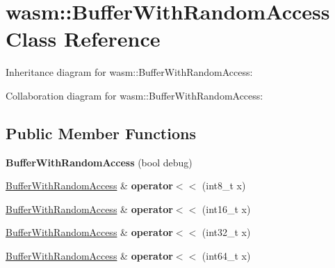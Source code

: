 \hypertarget{classwasm_1_1_buffer_with_random_access}{}\section{wasm\+:\+:Buffer\+With\+Random\+Access Class Reference}
\label{classwasm_1_1_buffer_with_random_access}


Inheritance diagram for wasm\+:\+:Buffer\+With\+Random\+Access\+:


Collaboration diagram for wasm\+:\+:Buffer\+With\+Random\+Access\+:
\subsection*{Public Member Functions}
\begin{DoxyCompactItemize}
\item 
\mbox{\label{classwasm_1_1_buffer_with_random_access_a9eb22137105e617a61d2772efd52cf34}} 
{\bfseries Buffer\+With\+Random\+Access} (bool debug)
\item 
\mbox{\label{classwasm_1_1_buffer_with_random_access_a70e75d55e7aae07ebf3d09c8dde61082}} 
\mbox{\hyperlink{classwasm_1_1_buffer_with_random_access}{Buffer\+With\+Random\+Access}} \& {\bfseries operator$<$$<$} (int8\+\_\+t x)
\item 
\mbox{\label{classwasm_1_1_buffer_with_random_access_a00bd82101203e74db45729b890937623}} 
\mbox{\hyperlink{classwasm_1_1_buffer_with_random_access}{Buffer\+With\+Random\+Access}} \& {\bfseries operator$<$$<$} (int16\+\_\+t x)
\item 
\mbox{\label{classwasm_1_1_buffer_with_random_access_a81f593f579bd5efad3566ba7a9d5f656}} 
\mbox{\hyperlink{classwasm_1_1_buffer_with_random_access}{Buffer\+With\+Random\+Access}} \& {\bfseries operator$<$$<$} (int32\+\_\+t x)
\item 
\mbox{\label{classwasm_1_1_buffer_with_random_access_a4b658b6fabd7b28edf59fa3345c5c02b}} 
\mbox{\hyperlink{classwasm_1_1_buffer_with_random_access}{Buffer\+With\+Random\+Access}} \& {\bfseries operator$<$$<$} (int64\+\_\+t x)

\end{DoxyCompactItemize}
